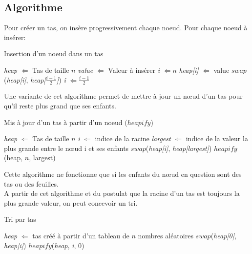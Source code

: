 \documentclass[11pt]{extarticle}
\begin{document}
\subsection{Algorithme}
Pour créer un tas, on insère progressivement chaque noeud.
Pour chaque noeud à insérer:\\
\begin{algorithm}[H]
\caption{Insertion d'un noeud dans un tas}\label{node_insertion}
\begin{algorithmic} %
    \State \textit{heap} $\Leftarrow $ Tas de taille $n$
    \State \textit{value} $\Leftarrow $ Valeur à insérer
    \State \textit{i} $\Leftarrow n$
    \State \textit{heap[i]} $\Leftarrow $ value
		\State $swap$(\textit{heap[i]}, \textit{heap[}$\frac{\textit{i}-1}{2}$\textit{]})	    
		\State \textit{i} $\Leftarrow \frac{\textit{i}-1}{2}$
	\EndWhile
\end{algorithmic}
\end{algorithm}
Une variante de cet algorithme permet de mettre à jour un nœud d'un tas pour qu'il reste plus grand que ses enfants.
\begin{algorithm}[H]
\caption{Mis à jour d'un tas à partir d'un noeud ($heapify$)}\label{heapify}
\begin{algorithmic} %
    \State \textit{heap} $\Leftarrow $ Tas de taille $n$
    \State \textit{i} $\Leftarrow $ indice de la racine
   	\State \textit{largest} $\Leftarrow $ indice de la valeur la plus grande entre le nœud i et ses enfants
   		\State $swap$(\textit{heap[i]}, \textit{heap[largest]})
   		\State $heapify$(heap, $n$, largest)
   	\EndIf
\end{algorithmic}
\end{algorithm}
Cette algorithme ne fonctionne que si les enfants du nœud en question sont des tas ou des feuilles.\\
A partir de cet algorithme et du postulat que la racine d'un tas est toujours la plus grande valeur, on peut concevoir un tri.
\begin{algorithm}[H]
\caption{Tri par tas}\label{heap_sort}
\begin{algorithmic} %
	\State \textit{heap} $\Leftarrow $ tas créé à partir d'un tableau de $n$ nombres aléatoires
    	\State $swap$(\textit{heap[0]}, \textit{heap[i]})
    	\State $heapify$(\textit{heap}, \textit{i}, 0)
    \EndFor
\end{algorithmic}
\end{algorithm}
\newpage
\end{document}

